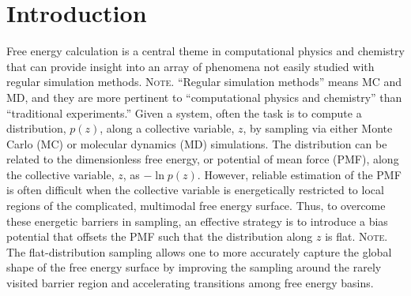 \documentclass[reprint, superscriptaddress, floatfix]{revtex4-1}
\newcommand{\note}[1]{{\color{DarkGreen}\footnotesize \textsc{Note.} #1}}
\begin{document}
\section{Introduction}



Free energy calculation\cite{frenkel, newman} is a central theme
in computational physics and chemistry
that can provide insight into an array of phenomena not easily studied
with regular simulation methods.
\note{``Regular simulation methods'' means MC and MD,
and they are more pertinent to ``computational physics and chemistry''
than ``traditional experiments.''}%
%
Given a system,
often the task is to compute
a distribution, $p(z)$,
along a collective variable, $z$, by sampling via either Monte Carlo\cite{
  frenkel, newman, landau_binder} (MC)
or molecular dynamics\cite{frenkel, karplus2002} (MD) simulations.
%
The distribution can be related to
the dimensionless free energy, or potential of mean force (PMF),
along the collective variable, $z$,
as $-\ln p(z)$.
%
However, reliable estimation of the PMF is often difficult
when the collective variable is energetically restricted to local regions
of the complicated, multimodal free energy surface.
%
Thus,
to overcome these energetic barriers in sampling,
an effective strategy is to introduce a bias potential that
offsets the PMF
such that the distribution along $z$ is
flat\cite{mezei1987, berg1992, *lee1993,
wang2001, wang2001pre,
huber1994,
*laio2002, *laio2008, *barducci2011, *sutto2012}.
%
\note{The flat-distribution sampling
allows one to more accurately capture the
global shape of the free energy surface
by improving the sampling around the rarely visited barrier region
and accelerating transitions among free energy basins.}
\end{document}
